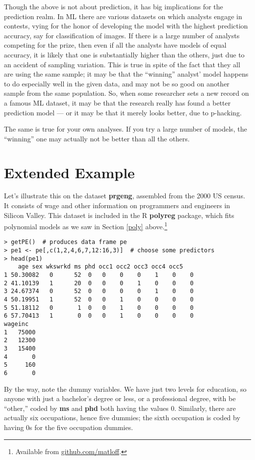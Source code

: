 Though the above is not about prediction, it has big implications for
the prediction realm.  In ML there are various datasets on which
analysts engage in contests, vying for the honor of developing the model
with the highest prediction accuracy, say for classification of images.
If there is a large number of analysts competing for the prize, then
even if all the analysts have models of equal accuracy, it is likely
that one is substantially higher than the others, just due to an
accident of sampling variation.  This is true in spite of the fact that
they all are using the same sample; it may be that the ``winning''
analyst' model happens to do especially well in the given data, and may
not be so good on another sample from the same population.  So, when some
researcher sets a new record on a famous ML dataset, it may be that the
research really has found a better prediction model --- or it may be
that it merely looks better, due to p-hacking.

The same is true for your own analyses.  If you try a large number of
models, the ``winning'' one may actually not be better than all the
others.

\section{Extended Example}
\label{prgengex}

Let's illustrate this on the dataset \textbf{prgeng}, assembled from the
2000 US census.  It consists of wage and other information on programmers and
engineers in Silicon Valley.  This dataset is included in the R
\textbf{polyreg} package, which fits polynomial models as we saw in
Section \ref{poly} above.\footnote{Available from
\url{github.com/matloff}.}

\begin{lstlisting}
> getPE()  # produces data frame pe
> pe1 <- pe[,c(1,2,4,6,7,12:16,3)]  # choose some predictors
> head(pe1)
    age sex wkswrkd ms phd occ1 occ2 occ3 occ4 occ5
1 50.30082   0      52  0   0    0    0    1    0    0
2 41.10139   1      20  0   0    0    1    0    0    0
3 24.67374   0      52  0   0    0    0    1    0    0
4 50.19951   1      52  0   0    1    0    0    0    0
5 51.18112   0       1  0   0    1    0    0    0    0
6 57.70413   1       0  0   0    1    0    0    0    0
wageinc
1   75000
2   12300
3   15400
4       0
5     160
6       0
\end{lstlisting}

By the way, note the dummy variables.  We have just two levels for
education, so anyone with just a bachelor's degree or less, or a
professional degree, with be ``other,'' coded by \textbf{ms} and
\textbf{phd} both having the values 0.  Similarly, there are actually
six occupations, hence five dummies; the sixth occupation is coded by
having 0s for the five occupation dummies.

